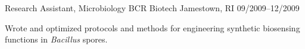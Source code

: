 \begin{cventries}
  \cventry
    {Research Assistant, Microbiology} %
    {BCR Biotech} %
    {Jamestown, RI} %
    {09/2009--12/2009} %
    {
      \begin{cvitems} %
        \item {Wrote and optimized protocols and methods for engineering synthetic biosensing functions in \textit{Bacillus} spores.}
      \end{cvitems}
    }
\end{cventries}
